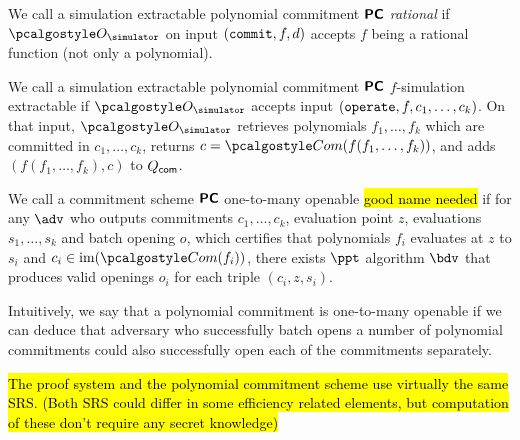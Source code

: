 \documentclass[runningheads,11pt]{llncs}
\begin{document}
\begin{definition}
   \label{def:rational_sepcom}
   We call a simulation extractable polynomial commitment $\bm{\mathsf{PC}}$
   \emph{rational} if $\oracles$ on input $(\mathtt{commit}, f, d)$ accepts $f$
   being a rational function (not only a polynomial).
 \end{definition}

 \begin{definition}[$f$-SE PCOM]
   \label{def:f_sepcom}
   We call a simulation extractable polynomial commitment $\bm{\mathsf{PC}}$ $f$-simulation
   extractable if $\oracles$ accepts input
   $(\mathtt{operate}, f, c_1, \ldots, c_k)$. On that input, $\oracles$ retrieves
   polynomials $f_1, \ldots, f_k$ which are committed in $c_1, \ldots, c_k$, 
   returns $c = \com(f(f_1, \ldots, f_k))$, and adds $(f(f_1, \ldots, f_k), c)$
   to $Q_{\mathsf{com}}$.
 \end{definition}

 \begin{definition}
   We call a commitment scheme $\bm{\mathsf{PC}}$ one-to-many openable \hl{good name
     needed} if for any $\adv$ who outputs commitments $c_1, \ldots, c_k$,
   evaluation point $z$, evaluations $s_1, \ldots, s_k$ and batch opening $o$,
   which certifies that polynomials $f_i$ evaluates at $z$ to $s_i$ and
   $c_i \in \image(\com(f_i))$, there exists $\ppt$ algorithm $\bdv$ that
   produces valid openings $o_i$ for each triple $(c_i, z, s_i)$.
 \end{definition}
 Intuitively, we say that a polynomial commitment is one-to-many openable if we
 can deduce that adversary who successfully batch opens a number of polynomial
 commitments could also successfully open each of the commitments separately.


 \begin{definition}
\hl{The proof system and the polynomial commitment scheme use virtually the same
SRS. (Both SRS could differ in some efficiency related elements, but computation
    of these don't require any secret knowledge)}
   \end{definition}
\end{document}
